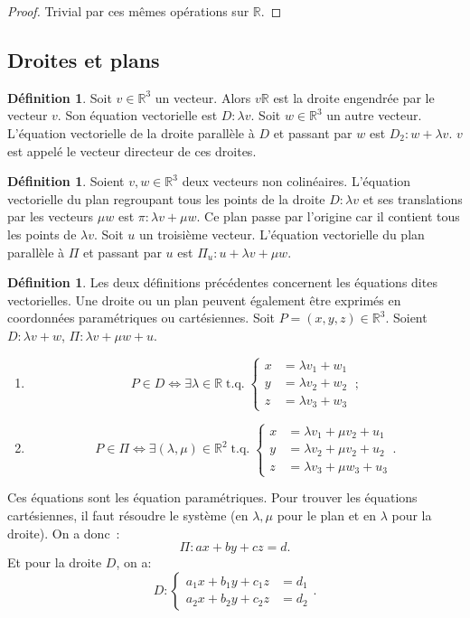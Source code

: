 \documentclass{article}
\DeclareMathOperator{\tq}{\text{ t.q. }}
\newcommand{\R}{\mathbb R}
\theoremstyle{definition}
\newtheorem{déf}[thm]{Définition}
\theoremstyle{remark}
\begin{document}
		\begin{proof} Trivial par ces mêmes opérations sur $\R$. \end{proof}

	\subsection{Droites et plans}
		\begin{déf} Soit $v \in \R^3$ un vecteur. Alors $v\R$ est la droite engendrée par le vecteur $v$. Son équation vectorielle est $D : \lambda v$.
		Soit $w \in \R^3$ un autre vecteur. L'équation vectorielle de la droite parallèle à $D$ et passant par $w$ est $D_2 : w + \lambda v$. $v$ est appelé le
		vecteur directeur de ces droites. \end{déf}

		\begin{déf} Soient $v, w \in \R^3$ deux vecteurs non colinéaires. L'équation vectorielle du plan regroupant tous les points de la droite $D : \lambda v$
		et ses translations par les vecteurs $\mu w$ est $\pi : \lambda v + \mu w$. Ce plan passe par l'origine car il contient tous les points de $\lambda v$.
		Soit $u$ un troisième vecteur. L'équation vectorielle du plan parallèle à $\Pi$ et passant par $u$ est $\Pi_u : u + \lambda v + \mu w$. \end{déf}

		\begin{déf} Les deux définitions précédentes concernent les équations dites vectorielles. Une droite ou un plan peuvent également être exprimés en coordonnées
		paramétriques ou cartésiennes. Soit $P = (x, y, z) \in \R^3$. Soient $D : \lambda v + w$, $\Pi : \lambda v + \mu w + u$.
		\begin{enumerate}
			\item \[P \in D \iff \exists \lambda \in \R \tq \left\{\begin{aligned}x &= \lambda v_1 + w_1 \\y &= \lambda v_2 + w_2 \\z &= \lambda v_3 + w_3\end{aligned}\right.~;\]
			\item \[P \in \Pi \iff \exists (\lambda, \mu) \in \R^2 \tq
			\left\{\begin{aligned}
				x &= \lambda v_1 + \mu v_2 + u_1 \\y &= \lambda v_2 + \mu v_2 + u_2 \\z &= \lambda v_3 + \mu w_3 + u_3
			\end{aligned}\right..\]
		\end{enumerate}

		Ces équations sont les équation paramétriques. Pour trouver les équations cartésiennes, il faut résoudre le système (en $\lambda, \mu$ pour le plan et en $\lambda$
		pour la droite). On a donc~: \[\Pi : ax + by + cz = d.\] Et pour la droite $D$, on a:
		\[D : \left\{\begin{aligned}a_1x + b_1y + c_1z &= d_1 \\a_2x + b_2y + c_2z &= d_2\end{aligned}\right..\] \end{déf}
\end{document}
